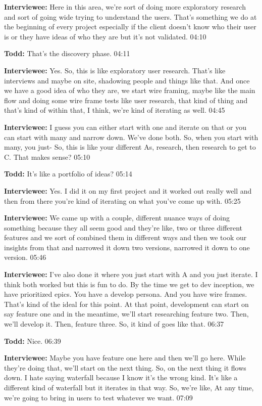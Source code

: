 \textbf{Interviewee:} Here in this area, we're sort of doing more exploratory research and sort of going wide trying to understand the users. That's something we do at the beginning of every project especially if the client doesn't know who their user is or they have ideas of who they are but it's not validated. 04:10

\textbf{Todd:} 	That's the discovery phase. 04:11

\textbf{Interviewee:} Yes. So, this is like exploratory user research. That's like interviews and maybe on site, shadowing people and things like that. And once we have a good idea of who they are, we start wire framing, maybe like the main flow and doing some wire frame tests like user research, that kind of thing and that's kind of within that, I think, we're kind of iterating as well. 04:45

\textbf{Interviewee:} I guess you can either start with one and iterate on that or you can start with many and narrow down. We've done both. So, when you start with many, you just- So, this is like your different As, research, then research to get to C. That makes sense? 05:10

\textbf{Todd:} It's like a portfolio of ideas? 05:14

\textbf{Interviewee:} Yes. I did it on my first project and it worked out really well and then from there you're kind of iterating on what you've come up with. 05:25

\textbf{Interviewee:} We came up with a couple, different nuance ways of doing something because they all seem good and they're like, two or three different features and we sort of combined them in different ways and then we took our insights from that and narrowed it down two versions, narrowed it down to one version. 05:46

\textbf{Interviewee:} I've also done it where you just start with A and you just iterate. I think both worked but this is fun to do. By the time we get to dev inception, we have prioritized epics. You have a develop persona. And you have wire frames. That's kind of the ideal for this point. At that point, development can start on say feature one and in the meantime, we'll start researching feature two. Then, we'll develop it. Then, feature three. So, it kind of goes like that. 06:37

\textbf{Todd:} Nice. 06:39

\textbf{Interviewee:} Maybe you have feature one here and then we'll go here. While they're doing that, we'll start on the next thing. So, on the next thing it flows down. I hate saying waterfall because I know it's the wrong kind. It's like a different kind of waterfall but it iterates in that way. So, we're like,  At any time, we're going to bring in users to test whatever we want. 07:09

